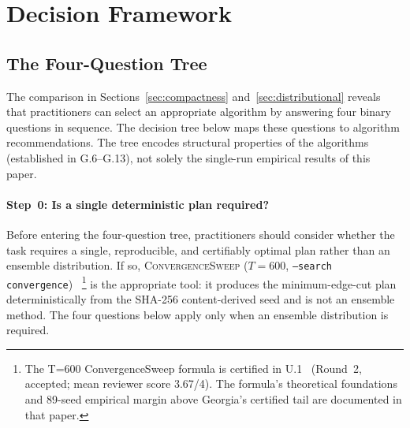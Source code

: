 \section{Decision Framework}
\label{sec:decision}

\subsection{The Four-Question Tree}

The comparison in Sections~\ref{sec:compactness}
and~\ref{sec:distributional} reveals that practitioners can select an
appropriate algorithm by answering four binary questions in sequence.
The decision tree below maps these questions to algorithm recommendations.
The tree encodes structural properties of the algorithms (established in
G.6--G.13), not solely the single-run empirical results of this paper.

\paragraph{Step~0: Is a single deterministic plan required?}
Before entering the four-question tree, practitioners should consider
whether the task requires a single, reproducible, and certifiably optimal
plan rather than an ensemble distribution.
If so, \textsc{ConvergenceSweep} ($T = 600$, \texttt{--search convergence})~%
\footnote{The T=600 ConvergenceSweep formula is certified in U.1~\cite{deluca2026convergence} (Round~2, accepted; mean reviewer score 3.67/4). The formula's theoretical foundations and 89-seed empirical margin above Georgia's certified tail are documented in that paper.}
is the appropriate tool: it produces the minimum-edge-cut plan deterministically
from the SHA-256 content-derived seed and is not an ensemble method.
The four questions below apply only when an ensemble distribution is required.

